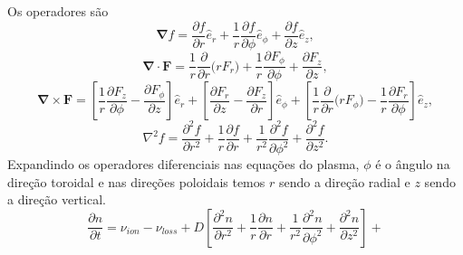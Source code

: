 \begin{frame}

Os operadores são
\begin{equation*}
\bm{\nabla} f = \frac{\partial f}{\partial r} \hat{e}_r +  \frac{1}{r} \frac{\partial f}{\partial \phi} \hat{e}_\phi + \frac{\partial f}{\partial z} \hat{e}_z,
\end{equation*}
\begin{equation*}
\bm{\nabla} \cdot \bm{F} = \frac{1}{r}  \frac{\partial }{\partial r} \Big( r F_r \Big)+ \frac{1}{r} \frac{\partial F_\phi}{\partial \phi} +  \frac{\partial F_z}{\partial z} ,
\end{equation*} 
\begin{equation*}
\bm{\nabla} \times \bm{F} =  \left[\frac{1}{r} \frac{\partial F_z}{\partial \phi} - \frac{\partial F_\phi}{\partial z} \right]  \hat{e}_r + \left[  \frac{\partial F_r}{\partial z} -  \frac{\partial F_z}{\partial r}  \right] \hat{e}_\phi + \left[ \frac{1}{r} \frac{\partial}{\partial r}\Big( r F_\phi \Big) - \frac{1}{r} \frac{\partial F_r}{\partial \phi}  \right] \hat{e}_z,
\end{equation*} 
\begin{equation*}
\nabla^2 f = \frac{\partial^2 f}{\partial r^2} + \frac{1}{r} \frac{\partial f}{\partial r} + \frac{1}{r^2} \frac{\partial^2 f}{\partial \phi^2}  + \frac{\partial^2 f}{\partial z^2} .
\end{equation*}
Expandindo os operadores diferenciais nas equações do plasma, $\phi$ é o ângulo na direção toroidal e nas direções poloidais temos $r$ sendo a direção radial e $z$ sendo a direção vertical.
\begin{equation}
\frac{\partial n}{\partial t} = \nu_{ion} - \nu_{loss}+D \left[  \frac{\partial^2 n}{\partial r^2} + \frac{1}{r} \frac{\partial n}{\partial r} + \frac{1}{r^2} \frac{\partial^2 n}{\partial \phi^2}  + \frac{\partial^2 n}{\partial z^2} \right] + 
\end{equation}

\end{frame}
